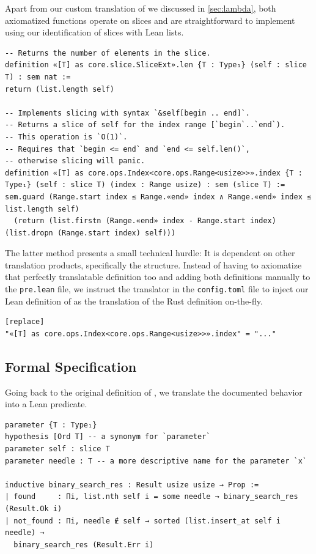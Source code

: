 Apart from our custom translation of  we discussed in
\autoref{sec:lambda}, both axiomatized functions operate on slices and are straightforward to
implement using our identification of slices with Lean lists.

\begin{verbatim}
-- Returns the number of elements in the slice.
definition «[T] as core.slice.SliceExt».len {T : Type₁} (self : slice T) : sem nat :=
return (list.length self)

-- Implements slicing with syntax `&self[begin .. end]`.
-- Returns a slice of self for the index range [`begin`..`end`).
-- This operation is `O(1)`.
-- Requires that `begin <= end` and `end <= self.len()`,
-- otherwise slicing will panic.
definition «[T] as core.ops.Index<core.ops.Range<usize>>».index {T : Type₁} (self : slice T) (index : Range usize) : sem (slice T) :=
sem.guard (Range.start index ≤ Range.«end» index ∧ Range.«end» index ≤ list.length self)
  (return (list.firstn (Range.«end» index - Range.start index) (list.dropn (Range.start index) self)))
\end{verbatim}

The latter method presents a
small technical hurdle: It is dependent on other translation products,
specifically the  structure. Instead of having to axiomatize that
perfectly translatable definition too and adding both definitions manually to the
\verb!pre.lean! file, we instruct the translator in the \verb!config.toml! file to inject our
Lean definition of  as the translation of the Rust definition on-the-fly.

\begin{verbatim}
[replace]
"«[T] as core.ops.Index<core.ops.Range<usize>>».index" = "..."
\end{verbatim}

\subsection{Formal Specification}

Going back to the original definition of , we translate
the documented behavior into a Lean predicate.

\begin{verbatim}
parameter {T : Type₁}
hypothesis [Ord T] -- a synonym for `parameter`
parameter self : slice T
parameter needle : T -- a more descriptive name for the parameter `x`

inductive binary_search_res : Result usize usize → Prop :=
| found     : Πi, list.nth self i = some needle → binary_search_res (Result.Ok i)
| not_found : Πi, needle ∉ self → sorted (list.insert_at self i needle) →
  binary_search_res (Result.Err i)
\end{verbatim}

